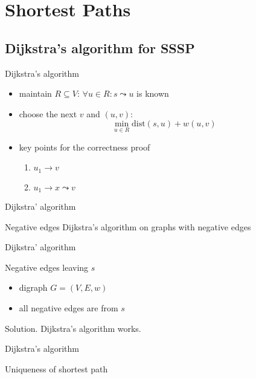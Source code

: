 \section{Shortest Paths}

\subsection{Dijkstra's algorithm for SSSP}

\begin{frame}{Dijkstra's algorithm}
  \begin{itemize}
    \item maintain $R \subseteq V$: $\forall u \in R: s \leadsto u$ is known
    \item choose the next $v$ and $(u,v)$:
      \[ \min_{u \in R} \text{dist}(s,u) + w(u,v) \]
    \item key points for the correctness proof
      \begin{enumerate}
	\item $u_{1} \to v$
	\item $u_{1} \to x \leadsto v$
      \end{enumerate}
  \end{itemize}
\end{frame}
\begin{frame}{Dijkstra' algorithm}
  \begin{exampleblock}{Negative edges }
    Dijkstra's algorithm on graphs with negative edges
  \end{exampleblock}
\end{frame}
\begin{frame}{Dijkstra' algorithm}
  \begin{exampleblock}{Negative edges leaving $s$ }
    \begin{itemize}
      \item digraph $G = (V, E, w)$
      \item all negative edges are from $s$
    \end{itemize}
  \end{exampleblock}

  \begin{block}{Solution.}
    Dijkstra's algorithm works.
  \end{block}
\end{frame}
\begin{frame}{Dijkstra's algorithm}
  \begin{exampleblock}{Uniqueness of shortest path }
    
  \end{exampleblock}
\end{frame}
